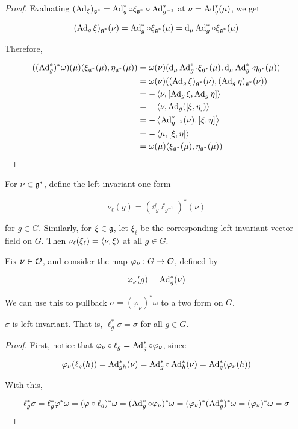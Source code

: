 \documentclass{article}
\begin{document}
\begin{proof}
    Evaluating \((\operatorname{Ad}_\xi)_{\mathfrak{g}^*} = \operatorname{Ad}_g^* \circ \xi_{\mathfrak{g}^*} \circ \operatorname{Ad}_{g^{-1}}^*\) at \(\nu = \operatorname{Ad}_g^*(\mu)\), we get

    \[(\operatorname{Ad}_g\xi)_{\mathfrak{g}^*}(\nu) = \operatorname{Ad}_g^* \circ \xi_{\mathfrak{g}^*}(\mu) = \dd_\mu\operatorname{Ad}_g^* \circ \xi_{\mathfrak{g}^*}(\mu)\]

    Therefore,

    \begin{align*}
        ((\operatorname{Ad}_g^*)^*\omega)(\mu)(\xi_{\mathfrak{g}^*}(\mu), \eta_{\mathfrak{g}^*}(\mu)) &= \omega(\nu)(\dd_\mu \operatorname{Ad}_g^* \cdot \xi_{\mathfrak{g}^*}(\mu), \dd_\mu \operatorname{Ad}_g^* \cdot \eta_{\mathfrak{g}^*}(\mu)) \\
        &= \omega(\nu)((\operatorname{Ad}_g\xi)_{\mathfrak{g}^*}(\nu), (\operatorname{Ad}_g\eta)_{\mathfrak{g}^*}(\nu)) \\
        &= -\left\langle \nu, [\operatorname{Ad}_g\xi, \operatorname{Ad}_g\eta] \right\rangle \\
        &= -\left\langle \nu, \operatorname{Ad}_g([\xi, \eta]) \right\rangle \\
        &= -\left\langle \operatorname{Ad}_{g^{-1}}^*(\nu), [\xi, \eta] \right\rangle \\
        &= -\left\langle \mu, [\xi, \eta] \right\rangle \\
        &= \omega(\mu)(\xi_{\mathfrak{g}^*}(\mu), \eta_{\mathfrak{g}^*}(\mu))
    \end{align*}
\end{proof}

For \(\nu \in \mathfrak{g}^*\), define the left-invariant one-form

\[\nu_\ell(g) = (\dd_g\ell_{g^{-1}})^*(\nu)\]

for \(g \in G\). Similarly, for \(\xi \in \mathfrak{g}\), let \(\xi_\ell\) be the corresponding left invariant vector field on \(G\). Then \(\nu_\ell(\xi_\ell) = \left\langle \nu, \xi \right\rangle\) at all \(g \in G\).

Fix \(\nu \in \mathcal{O}\), and consider the map \(\varphi_\nu : G \to \mathcal{O}\), defined by

\[\varphi_\nu(g) = \operatorname{Ad}_g^*(\nu)\]

We can use this to pullback \(\sigma = (\varphi_\nu)^*\omega\) to a two form on \(G\).

\begin{lemma}
    \(\sigma\) is left invariant. That is, \(\ell_g^*\sigma = \sigma\) for all \(g \in G\).
\end{lemma}

\begin{proof}
    First, notice that \(\varphi_\nu \circ \ell_g = \operatorname{Ad}_g^* \circ \varphi_\nu\), since

    \[\varphi_\nu(\ell_g(h)) = \operatorname{Ad}_{gh}^*(\nu) = \operatorname{Ad}_g^*\circ \operatorname{Ad}_h^*(\nu) = \operatorname{Ad}_g^*(\varphi_\nu(h))\]

    With this,

    \[\ell_g^*\sigma = \ell_g^*\varphi^*\omega = (\varphi\circ\ell_g)^*\omega = (\operatorname{Ad}_g^* \circ \varphi_\nu)^*\omega = (\varphi_\nu)^*(\operatorname{Ad}_g^*)^*\omega = (\varphi_\nu)^*\omega = \sigma\]
\end{proof}
\end{document}

